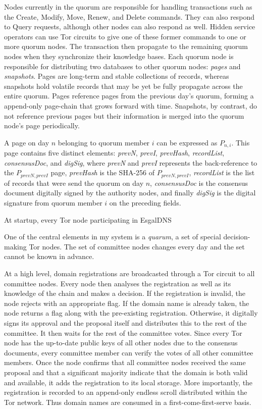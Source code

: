 Nodes currently in the quorum are responsible for handling transactions such as the Create, Modify, Move, Renew, and Delete commands. They can also respond to Query requests, although other nodes can also respond as well. Hidden service operators can use Tor circuits to give one of these former commands to one or more quorum nodes. The transaction then propagate to the remaining quorum nodes when they synchronize their knowledge bases. Each quorum node is responsible for distributing two databases to other quorum nodes: \textit{pages} and \textit{snapshots}. Pages are long-term and stable collections of records, whereas snapshots hold volatile records that may be yet be fully propagate across the entire quorum. Pages reference pages from the previous day's quorum, forming a append-only page-chain that grows forward with time. Snapshots, by contrast, do not reference previous pages but their information is merged into the quorum node's page periodically.

A page on day $ n $ belonging to quorum member $ i $ can be expressed as $ P_{n,i} $. This page contains five distinct elements: \textit{prevN}, \textit{prevI}, \textit{prevHash}, \textit{recordList}, \textit{consensusDoc}, and \textit{digSig}, where \textit{prevN} and \textit{prevI} represents the back-reference to the $ P_{prevN,prevI} $ page, \textit{prevHash} is the SHA-256 of $ P_{prevN,prevI} $, \textit{recordList} is the list of records that were send the quorum on day $ n $, \textit{consensusDoc} is the consensus document digitally signed by the authority nodes, and finally \textit{digSig} is the digital signature from quorum member $ i $ on the preceding fields.

At startup, every Tor node participating in EsgalDNS 







One of the central elements in my system is a \textit{quarum}, a set of special decision-making Tor nodes. The set of committee nodes changes every day and the set cannot be known in advance. 

At a high level, domain registrations are broadcasted through a Tor circuit to all committee nodes. Every node then analyses the registration as well as its knowledge of the chain and makes a decision. If the registration is invalid, the node rejects with an appropriate flag. If the domain name is already taken, the node returns a flag along with the pre-existing registration. Otherwise, it digitally signs its approval and the proposal itself and distributes this to the rest of the committee. It then waits for the rest of the committee votes. Since every Tor node has the up-to-date public keys of all other nodes due to the consensus documents, every committee member can verify the votes of all other committee members. Once the node confirms that all committee nodes received the same proposal and that a significant majority indicate that the domain is both valid and available, it adds the registration to its local storage. More importantly, the registration is recorded to an append-only endless scroll distributed within the Tor network. Thus domain names are consumed in a first-come-first-serve basis.

